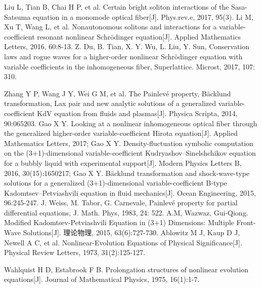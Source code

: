\begin{thebibliography}{0}
Liu L, Tian B, Chai H P, et al. Certain bright soliton interactions of the Sasa-Satsuma equation in a monomode optical fiber[J]. Phys.rev.e, 2017, 95(3).
Li M, Xu T, Wang L, et al. Nonautonomous solitons and interactions for a variable-coefficient resonant nonlinear Schr\"{o}dinger equation[J]. Applied Mathematics Letters, 2016, 60:8-13.
Z. Du, B. Tian, X. Y. Wu, L. Liu, Y. Sun, Conservation laws and rogue waves for a higher-order nonlinear Schr\"{o}dinger equation with variable coefficients in the inhomogeneous fiber, Superlattice.  Microst, 2017, 107: 310. %


Zhang Y  P, Wang J Y, Wei G M, et al. The Painlevé property, Bäcklund transformation, Lax pair and new analytic solutions of a generalized variable-coefficient KdV equation from fluids and plasmas[J]. Physica Scripta, 2014, 90:065203.
Gao X Y. Looking at a nonlinear inhomogeneous optical fiber through the generalized higher-order variable-coefficient Hirota equation[J]. Applied Mathematics Letters, 2017;
Gao X Y. Density-fluctuation symbolic computation on the (3+1)-dimensional variable-coefficient Kudryashov–Sinelshchikov equation for a bubbly liquid with experimental support[J]. Modern Physics Letters B, 2016, 30(15):1650217;
Gao X Y. Bäcklund transformation and shock-wave-type solutions for a generalized (3+1)-dimensional variable-coefficient B-type Kadomtsev–Petviashvili equation in fluid mechanics[J]. Ocean Engineering, 2015, 96:245-247.
J. Weiss, M. Tabor, G. Carnevale, Painlev\'{e} property for partial differential equations, J. Math. Phys, 1983, 24: 522. %
A.M, Wazwaz, Gui-Qiong. Modified Kadomtsev-Petviashvili Equation in (3+1) Dimensions: Multiple Front-Wave Solutions[J]. 理论物理, 2015, 63(6):727-730.
Ablowitz M J, Kaup D J, Newell A C, et al. Nonlinear-Evolution Equations of Physical Significance[J]. Physical Review Letters, 1973, 31(2):125-127.

Wahlquist H D, Estabrook F B. Prolongation structures of nonlinear evolution equations[J]. Journal of Mathematical Physics, 1975, 16(1):1-7.


\end{thebibliography}
